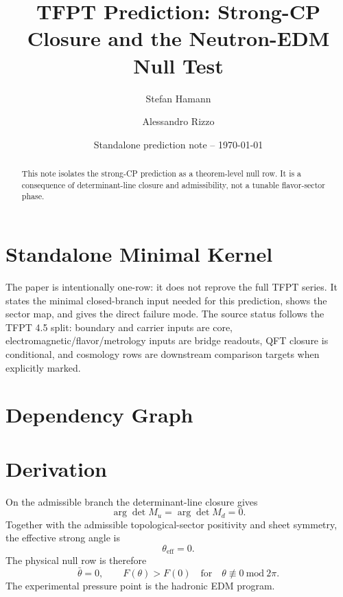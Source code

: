\documentclass[11pt,a4paper]{article}
\title{\color{tfptblue}\textbf{TFPT Prediction: Strong-CP Closure and the Neutron-EDM Null Test}}
\author{Stefan Hamann \and Alessandro Rizzo}
\date{{\normalsize\color{tfptgray}\sffamily Standalone prediction note -- \today}}
\begin{document}
\maketitle

\begin{abstract}
This note isolates the strong-CP prediction as a theorem-level null row. It is a consequence of determinant-line closure and admissibility, not a tunable flavor-sector phase.
\end{abstract}



\section{Standalone Minimal Kernel}
\MinimalKernelBox

The paper is intentionally one-row: it does not reprove the full TFPT series. It states the minimal closed-branch input needed for this prediction, shows the sector map, and gives the direct failure mode. The source status follows the TFPT 4.5 split: boundary and carrier inputs are core, electromagnetic/flavor/metrology inputs are bridge readouts, QFT closure is conditional, and cosmology rows are downstream comparison targets when explicitly marked.


\section{Dependency Graph}

\section{Derivation}

On the admissible branch the determinant-line closure gives
\[
\arg\det M_u=\arg\det M_d=0.
\]
Together with the admissible topological-sector positivity and sheet symmetry, the effective strong angle is
\[
\theta_{\mathrm{eff}}=0.
\]
The physical null row is therefore
\[
\bar\theta=0,
\qquad
F(\theta)>F(0)\quad\text{for}\quad \theta\not\equiv0\ \mathrm{mod}\ 2\pi.
\]
The experimental pressure point is the hadronic EDM program.
\end{document}
